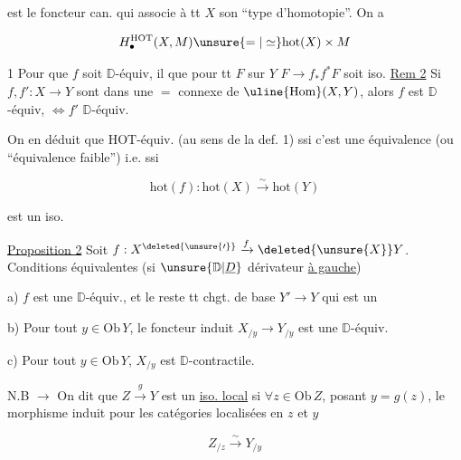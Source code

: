 est le foncteur  can. qui associe à tt $X$ son ``type d'homotopie''. On a

\[ H_\bullet^{\mathrm{HOT}}(X,M)\unsure{=|\simeq}\mathrm{hot}(X)\times M \]

  1 Pour que $f$ soit $\mathbb D$-équiv, il  que pour tt $F$  sur $Y$  $F\longrightarrow f_*f^*F$ soit iso. \uline{Rem 2} Si $f,f':X\longrightarrow Y$ sont dans une $=$  connexe de $\uline{\mathrm{Hom}}(X,Y)$, alors $f$ est $\mathbb D$-équiv, $\Leftrightarrow f'$ $\mathbb D$-équiv.

On en déduit que   $\mathrm{HOT}$-équiv. (au sens de la def. 1) ssi c'est une équivalence (ou ``équivalence faible'') i.e. ssi

\[ \mathrm{hot}(f):\mathrm{hot}(X)\xrightarrow{\sim}\mathrm{hot}(Y) \]

est un iso.

 \uline{Proposition 2} Soit $f:X^{\deleted{\unsure{\prime}}}\xrightarrow{f}\deleted{\unsure{X}}Y$. Conditions équivalentes (si $\unsure{\mathbb D|\underline D}$ dérivateur \uline{à gauche})

a) $f$ est une $\mathbb D$-équiv., et le reste   tt chgt. de base $Y'\longrightarrow Y$ qui est un   


b)  Pour tout $y\in\mathrm{Ob}\,Y$, le foncteur induit $X_{/y}\longrightarrow Y_{/y}$ est une $\mathbb D$-équiv.

c) Pour tout $y\in\mathrm{Ob}\,Y$, $X_{/y}$ est $\mathbb D$-contractile.

 N.B $\rightarrow$ On dit que $Z\xrightarrow{g}Y$ est un \uline{iso. local} si $\forall z\in\mathrm{Ob}\,Z$, posant $y=g(z)$, le morphisme induit pour les  catégories localisées en $z$ et $y$

\[ Z_{/z}\xrightarrow{\sim}Y_{/y} \]

